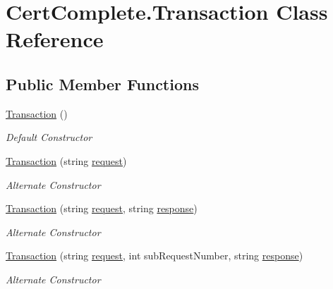 \hypertarget{class_cert_complete_1_1_transaction}{}\section{Cert\+Complete.\+Transaction Class Reference}
\label{class_cert_complete_1_1_transaction}
\subsection*{Public Member Functions}
\begin{DoxyCompactItemize}
\item 
\mbox{\hyperlink{class_cert_complete_1_1_transaction_afb2b05f628573e5439852eca5b5b80f1}{Transaction}} ()
\begin{DoxyCompactList}\small\item\em Default Constructor \end{DoxyCompactList}\item 
\mbox{\hyperlink{class_cert_complete_1_1_transaction_ae860fc76ec20cde74cdcaef8b2ba58f0}{Transaction}} (string \mbox{\hyperlink{class_cert_complete_1_1_transaction_ac85e595374528d6dd86fc8826609a20e}{request}})
\begin{DoxyCompactList}\small\item\em Alternate Constructor \end{DoxyCompactList}\item 
\mbox{\hyperlink{class_cert_complete_1_1_transaction_a8802a829baacf5773d7e85f66d419c59}{Transaction}} (string \mbox{\hyperlink{class_cert_complete_1_1_transaction_ac85e595374528d6dd86fc8826609a20e}{request}}, string \mbox{\hyperlink{class_cert_complete_1_1_transaction_aa514d482b586e66c3cb7d557563efc73}{response}})
\begin{DoxyCompactList}\small\item\em Alternate Constructor \end{DoxyCompactList}\item 
\mbox{\hyperlink{class_cert_complete_1_1_transaction_a4256176bcd42868e04a1382b6ca6416e}{Transaction}} (string \mbox{\hyperlink{class_cert_complete_1_1_transaction_ac85e595374528d6dd86fc8826609a20e}{request}}, int sub\+Request\+Number, string \mbox{\hyperlink{class_cert_complete_1_1_transaction_aa514d482b586e66c3cb7d557563efc73}{response}})
\begin{DoxyCompactList}\small\item\em Alternate Constructor \end{DoxyCompactList}\item 

\end{DoxyCompactItemize}
